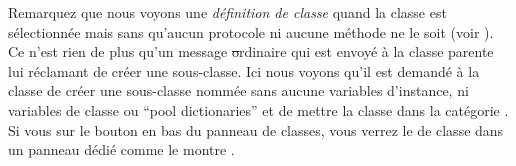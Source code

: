 \documentclass[a4paper,10pt,twoside]{book}
\begin{document}
Remarquez que nous voyons une \emph{définition de classe}
quand la classe  est sélectionnée mais sans qu'aucun
protocole ni aucune méthode ne le soit
(voir ).
Ce n'est rien de plus qu'un message \st ordinaire qui est envoyé à
la classe parente lui réclamant de créer une sous-classe.
Ici nous voyons qu'il est demandé à la classe  de
créer une sous-classe nommée  sans aucune variables
d'instance, ni variables de classe ou ``pool dictionaries'' et de 
mettre la classe  dans la catégorie .
Si vous \clickz{} sur le bouton  en bas du panneau
de classes, vous verrez le  de classe
dans un panneau dédié comme le montre . %




\end{document}

